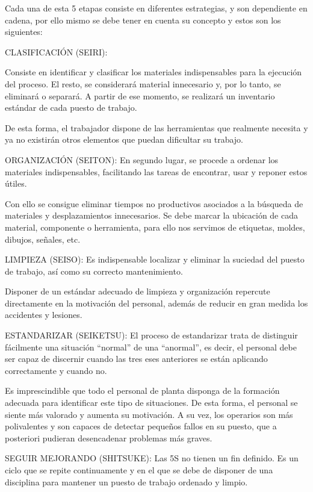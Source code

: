      Cada una de esta 5 etapas consiste en diferentes estrategias, y son dependiente en cadena, por ello mismo se debe tener en cuenta su concepto y estos  son los siguientes:
    
    CLASIFICACIÓN (SEIRI):
    
    Consiste en identificar y clasificar los materiales indispensables para la ejecución del proceso. El resto, se considerará material innecesario y, por lo tanto, se eliminará o separará. A partir de ese momento, se realizará un inventario estándar de cada puesto de trabajo.
    
    De esta forma, el trabajador dispone de las herramientas que realmente necesita y ya no existirán otros elementos que puedan dificultar su trabajo.
    
    ORGANIZACIÓN (SEITON):
    En segundo lugar, se procede a ordenar los materiales indispensables, facilitando las tareas de encontrar, usar y reponer estos útiles.
    
    Con ello se consigue eliminar tiempos no productivos asociados a la búsqueda de materiales y desplazamientos innecesarios. Se debe marcar la ubicación de cada material, componente o herramienta, para ello nos servimos de etiquetas, moldes, dibujos, señales, etc.
    
    LIMPIEZA (SEISO):
    Es indispensable localizar y eliminar la suciedad del puesto de trabajo, así como su correcto mantenimiento.
    
    Disponer de un estándar adecuado de limpieza y organización repercute directamente en la motivación del personal, además de reducir en gran medida los accidentes y lesiones.
    
    ESTANDARIZAR (SEIKETSU):
    El proceso de estandarizar trata de distinguir fácilmente una situación “normal” de una “anormal”, es decir, el personal debe ser capaz de discernir cuando las tres eses anteriores se están aplicando correctamente y cuando no.
    
    Es imprescindible que todo el personal de planta disponga de la formación adecuada para identificar este tipo de situaciones. De esta forma, el personal se siente más valorado y aumenta su motivación. A su vez, los operarios son más polivalentes y son capaces de detectar pequeños fallos en su puesto, que a posteriori pudieran desencadenar problemas más graves.
    
    SEGUIR MEJORANDO (SHITSUKE):
    Las 5S no tienen un fin definido. Es un ciclo que se repite continuamente y en el que se debe de disponer de una disciplina para mantener un puesto de trabajo ordenado y limpio.
    
